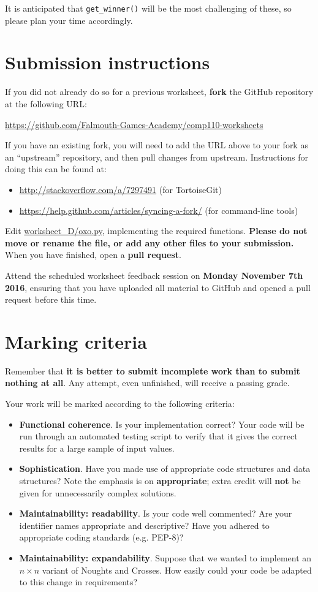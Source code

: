 \documentclass{../../fal_assignment}
\begin{document}
It is anticipated that \lstinline{get_winner()} will be the most challenging of these,
so please plan your time accordingly.

\section*{Submission instructions}

If you did not already do so for a previous worksheet, \textbf{fork} the GitHub repository at the following URL:

\url{https://github.com/Falmouth-Games-Academy/comp110-worksheets}

If you have an existing fork, you will need to add the URL above to your fork as an ``upstream'' repository,
and then pull changes from upstream. Instructions for doing this can be found at:
\begin{itemize}
	\item \url{http://stackoverflow.com/a/7297491} (for TortoiseGit)
	\item \url{https://help.github.com/articles/syncing-a-fork/} (for command-line tools)
\end{itemize}

Edit \url{worksheet_D/oxo.py}, implementing the required functions.
\textbf{Please do not move or rename the file, or add any other files to your submission.}
When you have finished, open a \textbf{pull request}.

Attend the scheduled worksheet feedback session on \textbf{Monday November 7th 2016},
ensuring that you have uploaded all material to GitHub and opened a pull request before this time.

\section*{Marking criteria}

Remember that \textbf{it is better to submit incomplete work than to submit nothing at all}.
Any attempt, even unfinished, will receive a passing grade.

Your work will be marked according to the following criteria:
\begin{itemize}
	\item \textbf{Functional coherence}. Is your implementation correct?
		Your code will be run through an automated testing script to verify that it gives the correct results for a large sample of input values.
	\item \textbf{Sophistication}. Have you made use of appropriate code structures and data structures?
		Note the emphasis is on \textbf{appropriate}; extra credit will \textbf{not} be given for unnecessarily complex solutions.
	\item \textbf{Maintainability: readability}. Is your code well commented? Are your identifier names appropriate and descriptive?
		Have you adhered to appropriate coding standards (e.g. PEP-8)?
	\item \textbf{Maintainability: expandability}. Suppose that we wanted to implement an $n \times n$ variant of Noughts and Crosses.
		How easily could your code be adapted to this change in requirements?
\end{itemize}
\end{document}

